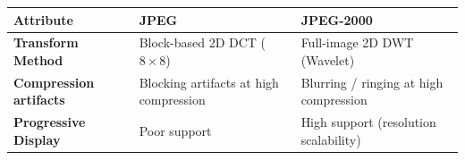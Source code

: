 \documentclass[12pt,a4paper]{article}
\renewcommand{\arraystretch}{1.45}
\begin{document}
\begin{tcolorbox}[tikzbox, title={JPEG vs. JPEG-2000 Comparison}]
\centering
{\renewcommand{\arraystretch}{1.55}%
\begin{tabularx}{\linewidth}{|>{\bfseries}B{3.2cm}|Y|Y|}
\hline
Attribute & JPEG & JPEG-2000 \\
\hline
Transform Method & Block-based 2D DCT ($8 \times 8$) & Full-image 2D DWT (Wavelet) \\
\hline
Compression artifacts & Blocking artifacts at high compression & Blurring / ringing at high compression \\[4pt]
\hline
Progressive Display & Poor support & High support (resolution scalability) \\
\hline
\end{tabularx}}
\end{tcolorbox}
\end{document}
